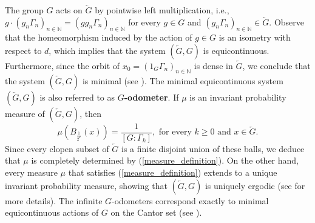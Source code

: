 \documentclass[titlepage,reqno,10pt]{amsart}
\newtheorem{proposition}[theorem]{Proposition}
\theoremstyle{definition}
\begin{document}
The group $G$ acts on $\overleftarrow{G}$ by pointwise left multiplication, i.e., $g\cdot(g_n\Gamma_n)_{n\in\mathbb{N}}=(gg_n\Gamma_n)_{n\in\mathbb{N}}$ for every $g\in G$ and $(g_n\Gamma_n)_{n\in\mathbb{N}} \in \overleftarrow{G}$. Observe that the homeomorphism induced by the action of $g\in G$ is an isometry with respect to $d$, which implies that the system $(\overleftarrow{G},G)$ is equicontinuous. Furthermore, since the orbit of $x_0=(1_G\Gamma_n)_{n\in\mathbb{N}}$ is dense in $\overleftarrow{G}$, we conclude that the system $(\overleftarrow{G},G)$ is minimal (see \cite[Page 37, Lemma 3]{Au88}). The minimal equicontinuous system $(\overleftarrow{G},G)$ is also referred to as \textbf{$G$-odometer}. If $\mu$ is an invariant probability measure of $(\overleftarrow{G},G)$, then  
\begin{equation}\label{measure_definition}
\mu\left(B_{\frac{1}{2^k}}(x) \right)=\frac{1}{[G:\Gamma_k]}, \mbox{ for every } k\geq 0 \mbox{ and } x\in \overleftarrow{G}.
\end{equation}
Since every clopen subset of $\overleftarrow{G}$ is a finite disjoint union of these balls, we deduce that $\mu$ is completely determined by   (\ref{measure_definition}). On the other hand, every measure $\mu$ that satisfies (\ref{measure_definition}) extends to a unique invariant probability measure, showing  that $(\overleftarrow{G},G)$ is uniquely ergodic (see \cite{CoPe08} for more details). The infinite $G$-odometers correspond exactly to minimal equicontinuous actions of $G$ on the Cantor set (see \cite[Proposition 12]{CoGo24}).
 

\end{document}

